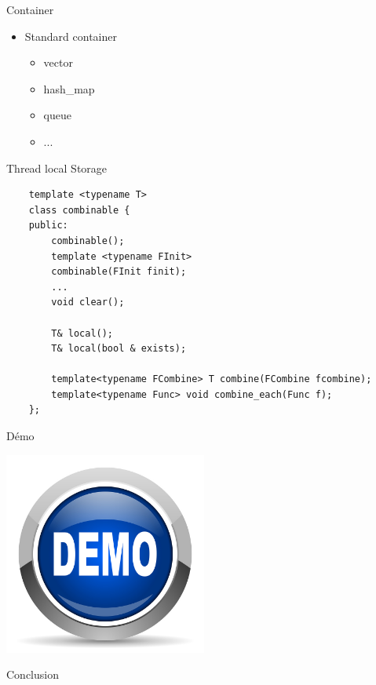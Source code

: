\documentclass[11pt]{beamer}
\begin{document}
\begin{frame}{Container}
	\begin{itemize}
		\item Standard container
		\begin{itemize}
			\item vector
			\item hash\_map
			\item queue
			\item ...
		\end{itemize}
	\end{itemize}
\end{frame}

\begin{frame}[fragile]{Thread local Storage}
\lstset{style=customcpp}
\lstset{language=C++}
\begin{lstlisting}
    template <typename T>
    class combinable {
    public:
        combinable();
        template <typename FInit>
        combinable(FInit finit);     
        ...
        void clear();
 
        T& local();
        T& local(bool & exists);
 
        template<typename FCombine> T combine(FCombine fcombine);
        template<typename Func> void combine_each(Func f);
    };
\end{lstlisting}
\end{frame}

\begin{frame}{Démo}
\begin{center}
\includegraphics[width=0.5\textwidth]{bluedemobutton}
\end{center}
\end{frame}

\begin{frame}{Conclusion}

\end{frame}
\end{document}
